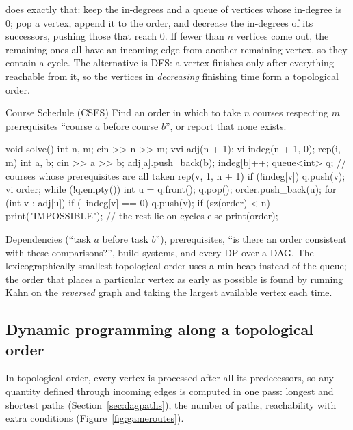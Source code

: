  does exactly that: keep the in-degrees and a queue of vertices whose in-degree is 0; pop a vertex, append it
to the order, and decrease the in-degrees of its successors, pushing those that reach 0. If fewer than $n$ vertices come out, the
remaining ones all have an incoming edge from another remaining vertex, so they contain a cycle. The alternative is DFS: a vertex
finishes only after everything reachable from it, so the vertices in \emph{decreasing} finishing time form a topological order.

\begin{problem}{Course Schedule (CSES)}
Find an order in which to take $n$ courses respecting $m$ prerequisites ``course $a$ before course $b$'', or report that none
exists.
\end{problem}

\begin{code}
void solve() {
    int n, m;
    cin >> n >> m;
    vvi adj(n + 1);
    vi indeg(n + 1, 0);
    rep(i, m) {
        int a, b;
        cin >> a >> b;
        adj[a].push_back(b);
        indeg[b]++;
    }
    queue<int> q;  // courses whose prerequisites are all taken
    rep(v, 1, n + 1) if (!indeg[v]) q.push(v);
    vi order;
    while (!q.empty()) {
        int u = q.front();
        q.pop();
        order.push_back(u);
        for (int v : adj[u])
            if (--indeg[v] == 0) q.push(v);
    }
    if (sz(order) < n) print("IMPOSSIBLE");  // the rest lie on cycles
    else print(order);
}
\end{code}


\begin{recognize}
Dependencies (``task $a$ before task $b$''), prerequisites, ``is there an order consistent with these comparisons?'', build
systems, and every DP over a DAG. The lexicographically smallest topological order uses a min-heap instead of the queue; the
order that places a particular vertex as early as possible is found by running Kahn on the \emph{reversed} graph and taking the
largest available vertex each time.
\end{recognize}

\subsection{Dynamic programming along a topological order}

In topological order, every vertex is processed after all its predecessors, so any quantity defined through incoming edges is
computed in one pass: longest and shortest paths (Section~\ref{sec:dagpaths}), the number of paths, reachability with extra
conditions (Figure~\ref{fig:gameroutes}).

